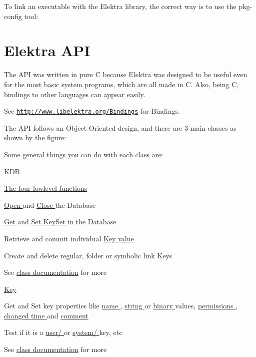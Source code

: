 To link an executable with the Elektra library, the correct way is to use the {\ttfamily pkg-\/config} tool: 
\hypertarget{index_classes}{}\section{Elektra API}\label{index_classes}
The API was written in pure C because Elektra was designed to be useful even for the most basic system programs, which are all made in C. Also, being C, bindings to other languages can appear easily.

See \href{http://www.libelektra.org/Bindings}{\tt http://www.libelektra.org/Bindings} for Bindings.

The API follows an Object Oriented design, and there are 3 main classes as shown by the figure:

 Some general things you can do with each class are:

\hyperlink{group__kdb}{KDB }
\begin{DoxyItemize}
\item \hyperlink{group__kdb}{The four lowlevel functions }
\item \hyperlink{group__kdb_ga6808defe5870f328dd17910aacbdc6ca}{Open } and \hyperlink{group__kdb_gadb54dc9fda17ee07deb9444df745c96f}{Close } the Database
\item \hyperlink{group__kdb_ga28e385fd9cb7ccfe0b2f1ed2f62453a1}{Get } and \hyperlink{group__kdb_ga11436b058408f83d303ca5e996832bcf}{Set } \hyperlink{group__keyset}{KeySet } in the Database
\item Retrieve and commit individual \hyperlink{}{Key value }
\item Create and delete regular, folder or symbolic link Keys
\item See \hyperlink{group__kdb}{class documentation} for more
\end{DoxyItemize}

\hyperlink{group__key}{Key }
\begin{DoxyItemize}
\item Get and Set key properties like \hyperlink{group__keyname_ga7699091610e7f3f43d2949514a4b35d9}{name }, \hyperlink{group__keyvalue_ga622bde1eb0e0c4994728331326340ef2}{string } or \hyperlink{group__keyvalue_gaa50a5358fd328d373a45f395fa1b99e7}{binary } values, \hyperlink{group__keymeta_gabc0cec592ce3b77e9bc33dbc8e8f6bdc}{permissions }, \hyperlink{group__keymeta_ga57689eb5691679071463b777ae786ae9}{changed time } and \hyperlink{group__keyvalue_gafb89735689929ff717cc9f2d0d0b46a2}{comment }
\item Test if it is a \hyperlink{group__keytest_ga373acc20c6209357045891f4b0c70041}{{\ttfamily user/} } or \hyperlink{group__keytest_gafe49cfb61c2accb3073131c23a56fb14}{{\ttfamily system/} } key, etc
\item See \hyperlink{group__key}{class documentation} for more
\end{DoxyItemize}

